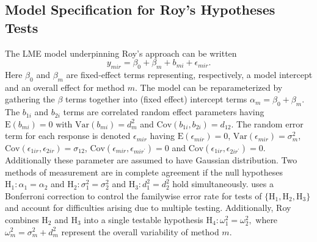 \documentclass[12pt, a4paper]{report}
\theoremstyle{plain}
\theoremstyle{definition}
\theoremstyle{remark}
\begin{document}
\subsection{Model Specification for Roy's Hypotheses Tests}
The LME model underpinning Roy's approach can be written
\begin{equation}\label{ARoy2009-model}
y_{mir} = \beta_{0} + \beta_{m} + b_{mi} + \epsilon_{mir}.
\end{equation}
Here $\beta_0$ and $\beta_m$ are fixed-effect terms representing, respectively, a model intercept and an overall effect for method $m.$ The model can be reparameterized by gathering the $\beta$ terms together into (fixed effect) intercept terms $\alpha_m=\beta_0+\beta_m.$ The $b_{1i}$ and $b_{2i}$ terms are correlated random effect parameters having $\mathrm{E}(b_{mi})=0$ with $\mathrm{Var}(b_{mi})=d^2_m$ and $\mathrm{Cov}(b_{1i}, b_{2 i})=d_{12}.$ The random error term for each response is denoted $\epsilon_{mir}$ having $\mathrm{E}(\epsilon_{mir})=0$, $\mathrm{Var}(\epsilon_{mir})=\sigma^2_m$, $\mathrm{Cov}(\epsilon_{1ir}, \epsilon_{2 ir})=\sigma_{12}$, $\mathrm{Cov}(\epsilon_{mir}, \epsilon_{mir^\prime})= 0$ and $\mathrm{Cov}(\epsilon_{1ir}, \epsilon_{2 ir^\prime})= 0.$ Additionally these parameter are assumed to have Gaussian distribution. Two methods of measurement are in complete agreement if the null hypotheses $\mathrm{H}_1\colon \alpha_1 = \alpha_2$ and $\mathrm{H}_2\colon \sigma^2_1 = \sigma^2_2 $ and $\mathrm{H}_3\colon d^2_1= d^2_2$ hold simultaneously. \citet{ARoy2009} uses a Bonferroni correction to control the familywise error rate for tests of $\{\mathrm{H}_1, \mathrm{H}_2, \mathrm{H}_3\}$ and account for difficulties arising due to multiple testing. Additionally, Roy combines $\mathrm{H}_2$ and $\mathrm{H}_3$ into a single testable hypothesis $\mathrm{H}_4\colon \omega^2_1=\omega^2_2,$ where $\omega^2_m = \sigma^2_m + d^2_m$ represent the overall variability of method $m.$


\end{document}
